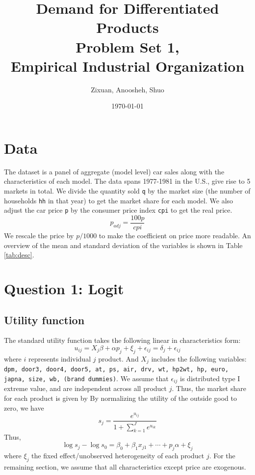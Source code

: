 \documentclass[12pt]{article}
\title{\textbf{Demand for Differentiated Products} \\
\vspace{.3cm}
\large Problem Set 1, \\
Empirical Industrial Organization}
\author{Zixuan, Anoosheh, Shuo}
\date{\today}
\begin{document}
\maketitle

\setcounter{page}{1}
\section{Data}
The dataset is a panel of aggregate (model level) car sales along with the
characteristics of each model. The data spans 1977-1981 in the U.S., give rise
to 5 markets in total. We divide the quantity sold \verb|q| by the market size
(the number of households \verb|hh| in that year) to get the market share for
each model. We also adjust the car price \verb|p| by the consumer price index
\verb|cpi| to get the real price.
\begin{equation*}
    p_{adj} = \frac{100 p}{cpi}
\end{equation*}
We rescale the price by $p/1000$ to make the coefficient on price more readable.
An overview of the mean and standard deviation of the variables is shown in Table \ref{tab:desc}.


\section{Question 1: Logit}
\subsection{Utility function}
The standard utility function takes the following linear in characteristics
form:
\begin{equation}
    u_{ij}=X_{j}\beta + \alpha p_{j} + \xi_{j}+ \epsilon_{ij}=\delta_j+\epsilon_{ij}
\end{equation}
where $i$ represents individual $j$ product. And $X_{j}$ includes the following variables:\\
\verb|dpm, door3, door4, door5, at, ps, air, drv, wt, hp2wt, hp, euro, japna, size, wb, (brand dummies)|.
We assume that $\epsilon_{ij}$ is distributed type I extreme value, and are independent across all product $j$. Thus, the market share for each product is given by
By normalizing the utility of the outside good to zero, we have
\begin{equation*}
    s_j=\frac{e^{u_{ij}}}{1+\sum_{k=1}^{J}e^{u_{ik}}}
\end{equation*}
Thus,
\begin{equation}\label{eq:logit}
    \log s_j-\log s_0=\beta_0+\beta_1x_{j1}+\cdots+p_j\alpha+\xi_j
\end{equation}
where $\xi_j$ the fixed effect/unobserved heterogeneity of each product $j$.
For the remaining section, we assume that all characteristics except price are exogenous.
\end{document}
